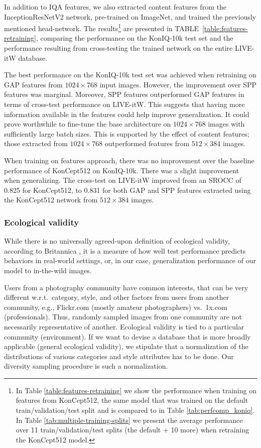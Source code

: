 \documentclass[10pt,journal,compsoc]{IEEEtran}
\begin{document}
In addition to IQA features, we also extracted content features from the InceptionResNetV2 network, pre-trained on ImageNet, and trained the previously mentioned head-network. The results\footnote{In Table \ref{table:features-retraining} we show the performance when training on features from KonCept512, the same model that was trained on the default train/validation/test split and is compared to in Table \ref{tab:perfcomp_koniq}. In Table \ref{tab:multiple-training-splits} we present the average performance over 11 train/validation/test splits (the default + 10 more) when retraining the KonCept512 model.} are presented in TABLE~\ref{table:features-retraining}, comparing the performance on the KonIQ-10k test set and the performance resulting from cross-testing the trained network on the entire LIVE-itW database.

The best performance on the KonIQ-10k test set was achieved when retraining on GAP features from $1024\times768$ input images. However, the improvement over SPP features was marginal. Moreover, SPP features outperformed GAP features in terms of cross-test performance on LIVE-itW. This suggests that having more information available in the features could help improve generalization. It could prove worthwhile to fine-tune the base architecture on $1024\times768$ images with sufficiently large batch sizes. This is supported by the effect of content features; those extracted from $1024\times768$ outperformed features from $512\times384$ images. 

When training on features approach, there was no improvement over the baseline performance of KonCept512 on KonIQ-10k. There was a slight improvement when generalizing. The cross-test on LIVE-itW improved from an SROCC of 0.825 for KonCept512, to 0.831 for both GAP and SPP features extracted using the KonCept512 network from  $512\times384$ images.

\subsubsection{Ecological validity}

While there is no universally agreed-upon definition of ecological validity, according to Britannica \cite{gouvier_ecological}, it is a measure of how well test performance predicts behaviors in real-world settings, or, in our case, generalization performance of our model to in-the-wild images.

Users from a photography community have common interests, that can be very different w.r.t.\ category, style, and other factors from users from another community, e.g., Flickr.com (mostly amateur photographers) vs.\ 1x.com (professionals). Thus, randomly sampled images from one community are not necessarily representative of another. Ecological validity is tied to a particular community (environment). If we want to devise a database that is more broadly applicable (general ecological validity), we stipulate that a normalization of the distributions of various categories and style attributes has to be done. Our diversity sampling procedure is such a normalization.
\end{document}
